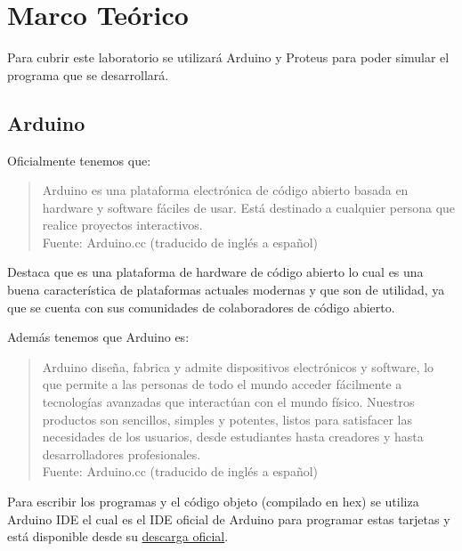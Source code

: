 \documentclass{article}
\begin{document}
    \section{Marco Teórico}\label{sec:marco-teórico}

    Para cubrir este laboratorio se utilizará Arduino y Proteus para poder
    simular el programa que se desarrollará.

    \subsection{Arduino}\label{subsec:arduino}

    Oficialmente tenemos que:

    \begin{quote}
        Arduino es una plataforma electrónica de código abierto basada en
        hardware y software fáciles de usar. Está destinado a cualquier
        persona que realice proyectos interactivos.\\ \footnotesize
        Fuente: Arduino.cc (traducido de inglés a español) \cite{arduino-2022}
    \end{quote}

    Destaca que es una plataforma de hardware de código abierto lo cual es
    una buena característica de plataformas actuales modernas y que son de
    utilidad, ya que se cuenta con sus comunidades de colaboradores de código
    abierto.

    Además tenemos que Arduino es:

    \begin{quote}
        Arduino diseña, fabrica y admite dispositivos electrónicos y
        software, lo que permite a las personas de todo el mundo acceder
        fácilmente a tecnologías avanzadas que interactúan con el mundo
        físico. Nuestros productos son sencillos, simples y potentes, listos
        para satisfacer las necesidades de los usuarios, desde estudiantes
        hasta creadores y hasta desarrolladores profesionales. \\ \footnotesize
        Fuente: Arduino.cc (traducido de inglés a español) \cite{arduino-2022}
    \end{quote}

    Para escribir los programas y el código objeto (compilado en hex) se
    utiliza Arduino IDE el cual es el IDE oficial de Arduino para programar
    estas tarjetas y está disponible desde su \href{https://docs.arduino.cc/software/ide-v2/tutorials/getting-started/ide-v2-downloading-and-installing}{descarga oficial}.
\end{document}
